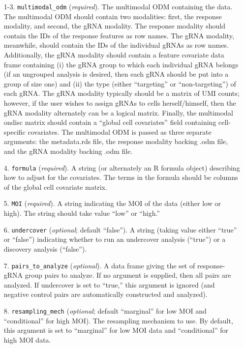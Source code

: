 \documentclass[12pt]{article}
\begin{document}
\begin{itemize}

\item[1-3.] \texttt{multimodal\_odm} (\textit{required}). The multimodal ODM containing the data. The multimodal ODM should contain two modalities: first, the response modality, and second, the gRNA modality. The response modality should contain the IDs of the response features as row names. The gRNA modality, meanwhile, should contain the IDs of the individual gRNAs as row names. Additionally, the gRNA modality should contain a feature covariate data frame containing (i) the gRNA group to which each individual gRNA belongs (if an ungrouped analysis is desired, then each gRNA should be put into a group of size one) and (ii) the type (either “targeting” or “non-targeting”) of each gRNA. The gRNA modality typically should be a matrix of UMI counts; however, if the user wishes to assign gRNAs to cells herself/himself, then the gRNA modality alternately can be a logical matrix. Finally, the multimodal ondisc matrix should contain a “global cell covariates” field containing cell-specific covariates. The multimodal ODM is passed as three separate arguments: the metadata.rds file, the response modality backing .odm file, and the gRNA modality backing .odm file.

\item[4.] \texttt{formula} (\textit{required}). A string (or alternately an R formula object) describing how to adjust for the covariates. The terms in the formula should be columns of the global cell covariate matrix.

\item[5.] \texttt{MOI} (\textit{required}). A string indicating the MOI of the data (either low or high). The string should take value “low” or “high.”

\item[6.] \texttt{undercover} (\textit{optional}; default “false”). A string (taking value either “true” or “false”) indicating whether to run an undercover analysis (“true”) or a discovery analysis (“false”).

\item[7.] \texttt{pairs\_to\_analyze} (\textit{optional}). A data frame giving the set of response-gRNA group pairs to analyze. If no argument is supplied, then all pairs are analyzed. If undercover is set to “true,” this argument is ignored (and negative control pairs are automatically constructed and analyzed).

\item[8.] \texttt{resampling\_mech} (\textit{optional}; default “marginal” for low MOI and “conditional” for high MOI). The resampling mechanism to use. By default, this argument is set to “marginal” for low MOI data and “conditional” for high MOI data.


\end{itemize}
\end{document}
